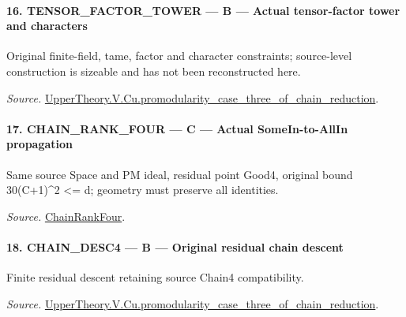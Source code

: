 \paragraph{16. TENSOR\_\allowbreak FACTOR\_\allowbreak TOWER — B — Actual tensor-factor tower and characters}

Original finite-field, tame, factor and character constraints; source-level construction is sizeable and has not been reconstructed here.

\emph{Source.} \href{https://github.com/CocoSgt/riemann-hypothesis-lean/blob/7cbf7a0c32fca1badf05931879a37c3f8a2b03b4/src/Development/AutomorphicArithmetic/AutomorphicVarieties/ModularityArgument/ThresholdArguments/DenseThresholdCases/PromodularityCaseThreeOfLemmas.lean#L131-L153}{UpperTheory.V.Cu.promodularity\_\allowbreak case\_\allowbreak three\_\allowbreak of\_\allowbreak chain\_\allowbreak reduction}.



\paragraph{17. CHAIN\_\allowbreak RANK\_\allowbreak FOUR — C — Actual SomeIn-to-AllIn propagation}

Same source Space and PM ideal, residual point Good4, original bound 30(C+1)\textasciicircum{}2 <= d; geometry must preserve all identities.

\emph{Source.} \href{https://github.com/CocoSgt/riemann-hypothesis-lean/blob/7cbf7a0c32fca1badf05931879a37c3f8a2b03b4/src/Development/AutomorphicArithmetic/AutomorphicVarieties/ModularityArgument/ThresholdArguments/DenseThresholdCases/PromodularityCaseThree.lean#L26-L32}{ChainRankFour}.



\paragraph{18. CHAIN\_\allowbreak DESC4 — B — Original residual chain descent}

Finite residual descent retaining source Chain4 compatibility.

\emph{Source.} \href{https://github.com/CocoSgt/riemann-hypothesis-lean/blob/7cbf7a0c32fca1badf05931879a37c3f8a2b03b4/src/Development/AutomorphicArithmetic/AutomorphicVarieties/ModularityArgument/ThresholdArguments/DenseThresholdCases/PromodularityCaseThreeOfLemmas.lean#L131-L153}{UpperTheory.V.Cu.promodularity\_\allowbreak case\_\allowbreak three\_\allowbreak of\_\allowbreak chain\_\allowbreak reduction}.



